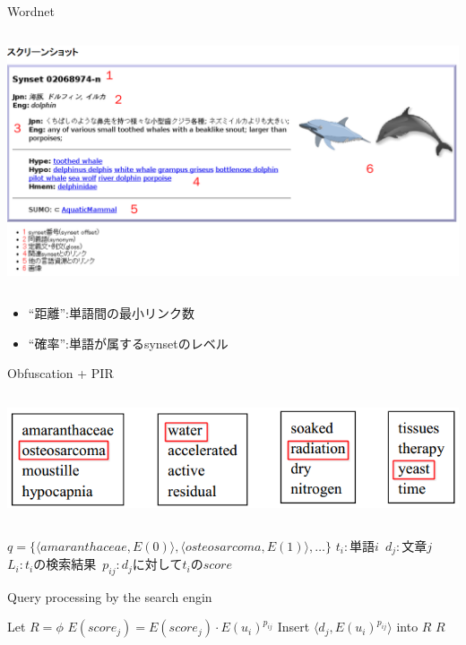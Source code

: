 \documentclass[14pt,xcolor=dvipsnames,table,dvipdfmx]{beamer}
\begin{document}
\begin{frame}{Wordnet}
	\begin{columns}[t]
		\begin{column}{1.0\textwidth} %
			\includegraphics[width=\columnwidth]{photo14.png}
		\end{column}
	\end{columns}
	\begin{block}{}
		\begin{itemize}
			\item “距離”:単語間の最小リンク数
			\item “確率”:単語が属するsynsetのレベル
		\end{itemize}
	\end{block}
\end{frame}
\begin{frame}{Obfuscation + PIR}
\fontsize{12pt}{7.2}\selectfont
	    \begin{columns}[t]
			\begin{column}{0.8\textwidth} %
				\includegraphics[width=\columnwidth]{photo15-1.png}
			\end{column}
		\end{columns}
    \begin{block}{}
    	$q = \{\langle amaranthaceae,E(0) \rangle , \langle osteosarcoma,E(1) \rangle , \dots \}$ 
    	$t_i:$単語$i\,$ $d_j:$文章$j\,$ $L_i:t_i$の検索結果 $\,p_{ij}:d_j$に対して$t_i$の$score$
    \end{block}
    \begin{block}{Query processing by the search engin}
        \begin{algorithmic}[1]
            \STATE Let $R = \phi$
            \STATE $E(score_j) = E(score_j) \cdot E(u_i)^{p_{ij}}$
            \ELSE \STATE Insert $\langle d_j,E(u_i)^{p_{ij}} \rangle$ into $R$
            \ENDIF
            \ENDFOR
            \ENDFOR
            \RETURN $R$
        \end{algorithmic}
    \end{block}
\end{frame}
\end{document}
